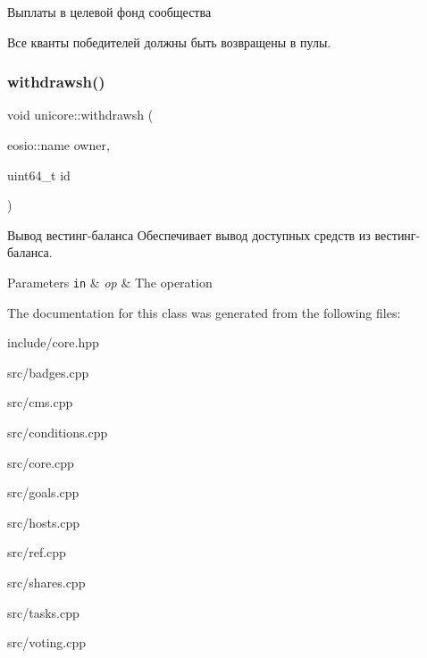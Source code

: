 Выплаты в целевой фонд сообщества

Все кванты победителей должны быть возвращены в пулы.\mbox{\label{classunicore_a4dd6d244c3fac428419342dc782f53a1}} 
\subsubsection{\texorpdfstring{withdrawsh()}{withdrawsh()}}
{\footnotesize\ttfamily void unicore\+::withdrawsh (\begin{DoxyParamCaption}\item[{eosio\+::name}]{owner,  }\item[{uint64\+\_\+t}]{id }\end{DoxyParamCaption})}



Вывод вестинг-\/баланса Обеспечивает вывод доступных средств из вестинг-\/баланса. 


\begin{DoxyParams}[1]{Parameters}
\mbox{\tt in}  & {\em op} & The operation \\
\hline
\end{DoxyParams}


The documentation for this class was generated from the following files\+:\begin{DoxyCompactItemize}
\item 
include/core.\+hpp\item 
src/badges.\+cpp\item 
src/cms.\+cpp\item 
src/conditions.\+cpp\item 
src/core.\+cpp\item 
src/goals.\+cpp\item 
src/hosts.\+cpp\item 
src/ref.\+cpp\item 
src/shares.\+cpp\item 
src/tasks.\+cpp\item 
src/voting.\+cpp\end{DoxyCompactItemize}
